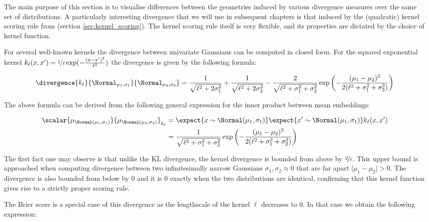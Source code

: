 The main purpose of this section is to visualise differences between the geometries induced by various divergence measures over the same set of distributions. A particularly interesting divergence that we will use in subsequent chapters is that induced by the (quadratic) kernel scoring rule from (section \ref{sec:kernel_scoring}). The kernel scoring rule itself is very flexible, and its properties are dictated by the choice of kernel function.

For several well-known kernels the divergence between univariate Gaussians can be computed in closed form.\citep{tailoring_density} For the squared exponential kernel $k_{\ell}(x,x')=\nicefrac{1}{\ell}\exp(-\frac{(x-x')^2}{\ell^2})$ the divergence is given by the following formula:

\begin{equation}
	\divergence{k_{\ell}}{\Normal_{\mu_1,\sigma_1}}{\Normal_{\mu_2,\sigma_2}} = \frac{1}{\sqrt{\ell^2+2\sigma_1^2}} + \frac{1}{\sqrt{\ell^2+2\sigma_2^2}} - \frac{2}{\sqrt{\ell^2+\sigma_1^2 + \sigma_2^2}}\exp\left(-\frac{(\mu_1 - \mu_2)^2}{2(\ell^2 + \sigma_1^2 + \sigma_2^2)}\right)
\end{equation}

The above formula can be derived from the following general expression for the inner product between mean embeddings:

\begin{align}
	\scalar{\mu_{\Normal(\mu_1,\sigma_1)}}{\mu_{\Normal(\mu_2,\sigma_2)}}_{k_{\ell}} &= \expect{x\sim \Normal(\mu_1,\sigma_1)}\expect{x' \sim \Normal(\mu_1,\sigma_1)} k_{\ell}(x,x')\\
	&= \frac{1}{\sqrt{\ell^2 + \sigma_1^2 + \sigma_2^2}}\exp\left(-\frac{(\mu_1 - \mu_2)^2}{2(\ell^2 + \sigma_1^2 + \sigma_2^2)}\right)
\end{align}	

The first fact one may observe is that unlike the KL divergence, the kernel divergence is bounded from above by $\nicefrac{2}{\ell}$. This upper bound is approached when computing divergence between two infinitesimally narrow Gaussians $\sigma_1,\sigma_2\approx 0$ that are far apart $\vert \mu_1 - \mu_2 \vert > 0$. The divergence is also bounded from below by $0$ and it is $0$ exactly when the two distributions are identical, confirming that this kernel function gives rise to a strictly proper scoring rule.

The Brier score is a special case of this divergence as the lengthscale of the kernel $\ell$ decreases to $0$. In that case we obtain the following expression:


